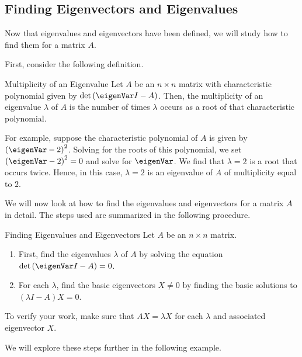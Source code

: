 \subsection{Finding Eigenvectors and Eigenvalues}

Now that eigenvalues and eigenvectors have been defined, we will study how to find
 them for a matrix $A$. 

First, consider the following definition.

\begin{definition}{Multiplicity of an Eigenvalue}\label{def:multiplicity}
Let $A$ be an $n \times n$ matrix with characteristic polynomial given by 
$\det \left( \eigenVar I -  A\right)$. Then, the multiplicity of an eigenvalue $\lambda$  of $A$
is the number of times $\lambda$ occurs as a root of that characteristic polynomial.
\end{definition}

For example, suppose the characteristic polynomial of $A$ is given by
$\left( \eigenVar - 2 \right)^2$. Solving for the roots of this
polynomial, we set $\left( \eigenVar - 2 \right)^2 = 0$ and solve for
$\eigenVar$.  We find that $\lambda = 2$ is a root that occurs
twice. Hence, in this case, $\lambda = 2$ is an eigenvalue of $A$ of
multiplicity equal to $2$.

We will now look at how to find the eigenvalues and eigenvectors for a
matrix $A$ in detail.  The steps used are summarized in the following
procedure.

\begin{procedure}{Finding Eigenvalues and Eigenvectors}\label{proc:findeigenvaluesvectors}
 
Let $A$ be an $n \times n$ matrix. 
\begin{enumerate}
\item First, find the eigenvalues $\lambda$ of $A$ by solving the equation $\det \left( \eigenVar I -A \right) = 0$. 

\item For each $\lambda$, find the basic eigenvectors $X \neq 0$ by finding the basic solutions to  $\left( \lambda I - A \right) X = 0$.
\end{enumerate}

To verify your work, make sure that $AX=\lambda X$
for each $\lambda$ and associated eigenvector $X$.
\end{procedure}

We will explore these steps further in the following example.

